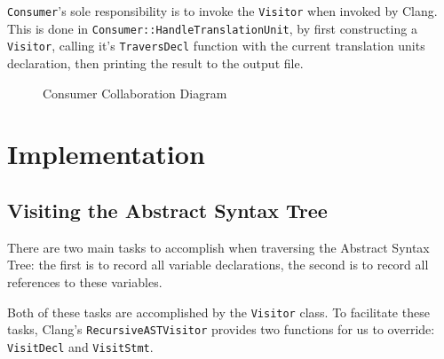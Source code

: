 \lstinline|Consumer|'s sole responsibility is to invoke the \lstinline|Visitor|
when invoked by Clang. This is done in
\lstinline|Consumer::HandleTranslationUnit|, by first constructing a
\lstinline|Visitor|, calling it's \lstinline|TraversDecl| function with the
current translation units declaration, then printing the result to the output
file.

\begin{figure}[h]
	\label{fig:Consumer}
	\caption{Consumer Collaboration Diagram}
	\centering
\end{figure}

\section{Implementation}
\subsection{Visiting the Abstract Syntax Tree}

There are two main tasks to accomplish when traversing the Abstract Syntax Tree:
the first is to record all variable declarations, the second is to record all
references to these variables.

Both of these tasks are accomplished by the \lstinline|Visitor| class.
To facilitate these tasks, Clang's \lstinline|RecursiveASTVisitor| provides two
functions for us to override: \lstinline|VisitDecl| and \lstinline|VisitStmt|.

